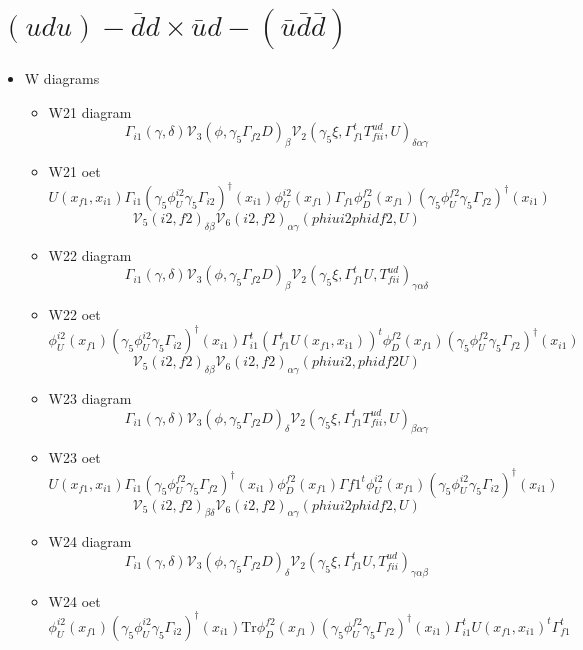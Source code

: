 \documentclass{article}[12pt]
\begin{document}
\section{$(udu)-\bar{d}d \times \bar{u}d-(\bar{u}\bar{d}\bar{d}) $}
\begin{itemize}
\item W diagrams
\begin{itemize}
\item W21 diagram
$$
\Gamma_{i1}\left(\gamma,\delta\right){\mathcal V}_3\left(\phi,\gamma_5\Gamma_{f2}D\right)_\beta{\mathcal V}_2\left(\gamma_5\xi,\Gamma_{f1}^tT^{ud}_{fii},U\right)_{\delta\alpha\gamma}
$$
\item W21 oet
$$
U(x_{f1},x_{i1})\Gamma_{i1}(\gamma_5\phi_U^{i2}\gamma_5\Gamma_{i2})^{\dagger}(x_{i1})\phi_U^{i2}(x_{f1})\Gamma_{f1}\phi_D^{f2}(x_{f1})(\gamma_5\phi_U^{f2}\gamma_5\Gamma_{f2})^{\dagger}(x_{i1})
$$
$$
{\mathcal V}_5(i2,f2)_{\delta\beta}{\mathcal V}_6(i2,f2)_{\alpha\gamma}(phiui2phidf2,U)
$$
\item W22 diagram
$$
\Gamma_{i1}\left(\gamma,\delta\right){\mathcal V}_3\left(\phi,\gamma_5\Gamma_{f2}D\right)_\beta{\mathcal V}_2\left(\gamma_5\xi,\Gamma_{f1}^tU,T^{ud}_{fii}\right)_{\gamma\alpha\delta}
$$
\item W22 oet
$$
\phi_U^{i2}(x_{f1})(\gamma_5\phi_U^{i2}\gamma_5\Gamma_{i2})^{\dagger}(x_{i1})
\Gamma_{i1}^t(\Gamma_{f1}^tU(x_{f1},x_{i1}))^t\phi_D^{f2}(x_{f1})(\gamma_5\phi_U^{f2}\gamma_5\Gamma_{f2})^{\dagger}(x_{i1})
$$
$$
{\mathcal V}_5(i2,f2)_{\delta\beta}{\mathcal V}_6(i2,f2)_{\alpha\gamma}(phiui2,phidf2U)
$$
\item W23 diagram
$$
\Gamma_{i1}\left(\gamma,\delta\right){\mathcal V}_3\left(\phi,\gamma_5\Gamma_{f2}D\right)_\delta{\mathcal V}_2\left(\gamma_5\xi,\Gamma_{f1}^tT^{ud}_{fii},U\right)_{\beta\alpha\gamma}
$$
\item W23 oet
$$
U(x_{f1},x_{i1})\Gamma_{i1}(\gamma_5\phi_U^{f2}\gamma_5\Gamma_{f2})^{\dagger}(x_{i1})\phi_D^{f2}(x_{f1})\Gamma{f1}^t\phi_U^{i2}(x_{f1})(\gamma_5\phi_U^{i2}\gamma_5\Gamma_{i2})^{\dagger}(x_{i1})
$$
$$
{\mathcal V}_5(i2,f2)_{\beta\delta}{\mathcal V}_6(i2,f2)_{\alpha\gamma}(phiui2phidf2,U)
$$
\item W24 diagram
$$
\Gamma_{i1}\left(\gamma,\delta\right){\mathcal V}_3\left(\phi,\gamma_5\Gamma_{f2}D\right)_\delta{\mathcal V}_2\left(\gamma_5\xi,\Gamma_{f1}^tU,T^{ud}_{fii}\right)_{\gamma\alpha\beta}
$$
\item W24 oet
$$
\phi_U^{i2}(x_{f1})(\gamma_5\phi_U^{i2}\gamma_5\Gamma_{i2})^{\dagger}(x_{i1})
\mathrm{Tr}\phi_D^{f2}(x_{f1})(\gamma_5\phi_U^{f2}\gamma_5\Gamma_{f2})^{\dagger}(x_{i1})\Gamma_{i1}^tU(x_{f1},x_{i1})^t\Gamma_{f1}^t
$$
\end{itemize}
\end{itemize}
\end{document}
